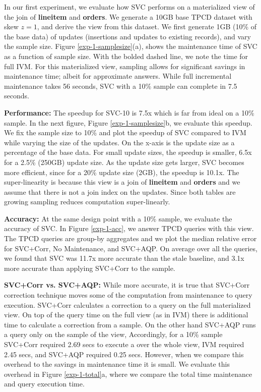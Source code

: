 
In our first experiment, we evaluate how SVC performs on a materialized view of the join of \textbf{lineitem} and \textbf{orders}.
We generate a 10GB base TPCD dataset with skew $z=1$, and derive the view from this dataset.
We first generate 1GB (10\% of the base data) of updates (insertions and updates to existing records), and vary the sample size.
Figure \ref{exp-1-samplesize}(a), shows the maintenance time of SVC as a function of sample size.
With the bolded dashed line, we note the time for full IVM. 
For this materialized view, sampling allows for significant savings in maintenance time; albeit for approximate answers.
While full incremental maintenance takes 56 seconds, SVC with a 10\% sample can complete in 7.5 seconds.

\textbf{Performance: }
The speedup for SVC-10 is 7.5x which is far from ideal on a 10\% sample.
In the next figure, Figure \ref{exp-1-samplesize}b, we evaluate this speedup. 
We fix the sample size to 10\% and plot the speedup of SVC compared to IVM while varying the size of the updates.
On the x-axis is the update size as a percentage of the base data.
For small update sizes, the speedup is smaller, 6.5x for a 2.5\% (250GB) update size.
As the update size gets larger, SVC becomes more efficient, since for a 20\% update size (2GB), the speedup is 10.1x. 
The super-linearity is because this view is a join of \textbf{lineitem} and \textbf{orders} and we assume that there is not a join index on the updates.
Since both tables are growing sampling reduces computation super-linearly. 

\textbf{Accuracy: }
At the same design point with a 10\% sample, we evaluate the accuracy of SVC.
In Figure \ref{exp-1-acc}, we answer TPCD queries with this view.
The TPCD queries are group-by aggregates and we plot the median relative error for SVC+Corr, No Maintenance, and SVC+AQP.
On average over all the queries, we found that SVC was 11.7x more accurate than the stale baseline, and 3.1x more accurate than applying SVC+Corr to the sample.

\textbf{SVC+Corr vs. SVC+AQP: }
While more accurate, it is true that SVC+Corr correction technique moves some of the computation from maintenance to query execution.
SVC+Corr calculates a correction to a query on the full materialized view.
On top of the query time on the full view (as in IVM) there is additional time to calculate a correction from a sample.
On the other hand SVC+AQP runs a query only on the sample of the view, 
Accordingly, for a 10\% sample SVC+Corr required 2.69 secs to execute a \sumfunc over the whole view, IVM required 2.45 secs, and  SVC+AQP required 0.25 secs.
However, when we compare this overhead to the savings in maintenance time it is small.
We evaluate this overhead in Figure \ref{exp-1-total}a, where we compare the total time maintenance and query execution time.

